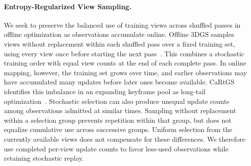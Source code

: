 \paragraph{Entropy-Regularized View Sampling.}
\label{ssec:ercb}
We seek to preserve the balanced use of training views across shuffled passes in offline optimization as observations accumulate online.
Offline 3DGS samples views without replacement within each shuffled pass over a fixed training set, using every view once before starting the next pass~\cite{kerbl20233dgs}.
This combines a stochastic training order with equal view counts at the end of each complete pass.
In online mapping, however, the training set grows over time, and earlier observations may have accumulated many updates before later ones become available.
CaRtGS identifies this imbalance in an expanding keyframe pool as long-tail optimization~\cite{cartgs}.
Stochastic selection can also produce unequal update counts among observations admitted at similar times.
Sampling without replacement within a selection group prevents repetition within that group, but does not equalize cumulative use across successive groups.
Uniform selection from the currently available views does not compensate for these differences.
We therefore use completed per-view update counts to favor less-used observations while retaining stochastic replay.

